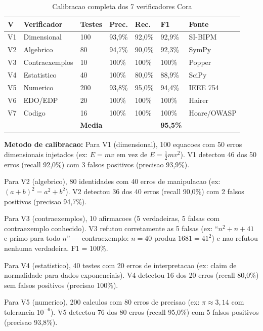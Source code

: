 \documentclass[12pt,a4paper,oneside]{article}
\begin{document}
\begin{table}[H]\centering\footnotesize
\caption{Calibracao completa dos 7 verificadores Cora}
\label{tab:calibracao}
\begin{tabular}{p{}p{}p{}p{}p{}p{}p{}}
\toprule
\textbf{V} & \textbf{Verificador} & \textbf{Testes} & \textbf{Prec.} & \textbf{Rec.} & \textbf{F1} & \textbf{Fonte} \\
\midrule
V1 & Dimensional & 100 & 93,9\% & 92,0\% & 92,9\% & SI-BIPM \\
V2 & Algebrico & 80 & 94,7\% & 90,0\% & 92,3\% & SymPy \\
V3 & Contraexemplos & 10 & 100\% & 100\% & 100\% & Popper \\
V4 & Estatistico & 40 & 100\% & 80,0\% & 88,9\% & SciPy \\
V5 & Numerico & 200 & 93,8\% & 95,0\% & 94,4\% & IEEE 754 \\
V6 & EDO/EDP & 20 & 100\% & 100\% & 100\% & Hairer \\
V7 & Codigo & 16 & 100\% & 100\% & 100\% & Hoare/OWASP \\
\midrule
\multicolumn{3}{r}{\textbf{Media}} & & & \textbf{95,5\%} & \\
\bottomrule
\end{tabular}
\end{table}

\textbf{Metodo de calibracao:} Para V1 (dimensional), 100 equacoes com 50 erros
dimensionais injetados (ex: $E = mv$ em vez de $E = \frac{1}{2}mv^2$). V1
detectou 46 dos 50 erros (recall 92,0\%) com 3 falsos positivos (precisao 93,9\%).

Para V2 (algebrico), 80 identidades com 40 erros de manipulacao (ex: $(a+b)^2
= a^2+b^2$). V2 detectou 36 dos 40 erros (recall 90,0\%) com 2 falsos positivos
(precisao 94,7\%).

Para V3 (contraexemplos), 10 afirmacoes (5 verdadeiras, 5 falsas com
contraexemplo conhecido). V3 refutou corretamente as 5 falsas (ex: ``$n^2+n+41$
e primo para todo $n$'' --- contraexemplo: $n=40$ produz $1681=41^2$) e nao
refutou nenhuma verdadeira. F1 = 100\%.

Para V4 (estatistico), 40 testes com 20 erros de interpretacao (ex: claim de
normalidade para dados exponenciais). V4 detectou 16 dos 20 erros (recall
80,0\%) sem falsos positivos (precisao 100\%).

Para V5 (numerico), 200 calculos com 80 erros de precisao (ex: $\pi \approx
3,14$ com tolerancia $10^{-6}$). V5 detectou 76 dos 80 erros (recall 95,0\%)
com 5 falsos positivos (precisao 93,8\%).
\end{document}
